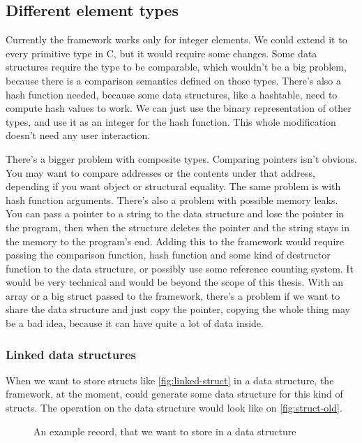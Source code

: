 \documentclass[a4paper,11pt]{article}
\begin{document}
	\subsection{Different element types}

		Currently the framework works only for integer elements. We could extend it to every primitive type in
		C, but it would require some changes.  Some data structures require the type to be comparable, which
		wouldn't be a big problem, because there is a comparison semantics defined on those types. There's also
		a hash function needed, because some data structures, like a hashtable, need to compute hash values to
		work. We can just use the binary representation of other types, and use it as an integer for the hash
		function. This whole modification doesn't need any user interaction.

		There's a bigger problem with composite types. Comparing pointers isn't obvious. You may want to compare
		addresses or the contents under that address, depending if you want object or structural equality. The
		same problem is with hash function arguments. There's also a problem with possible memory leaks. You can
		pass a pointer to a string to the data structure and lose the pointer in the program, then when the
		structure deletes the pointer and the string stays in the memory to the program's end. Adding this to
		the framework would require passing the comparison function, hash function and some kind of destructor
		function to the data structure, or possibly use some reference counting system. It would be very
		technical and would be beyond the scope of this thesis. With an array or a big struct passed to the
		framework, there's a problem if we want to share the data structure and just copy the pointer, copying
		the whole thing may be a bad idea, because it can have quite a lot of data inside.

		\subsubsection{Linked data structures}

			When we want to store structs like \autoref{fig:linked-struct} in a data structure, the
			framework, at the moment, could generate some data structure for this kind of structs. The
			operation on the data structure would look like on \autoref{fig:struct-old}.

            \begin{figure}[h!]
				

				\caption{An example record, that we want to store in a data structure}

				\label{fig:linked-struct}
			\end{figure}
\end{document}
